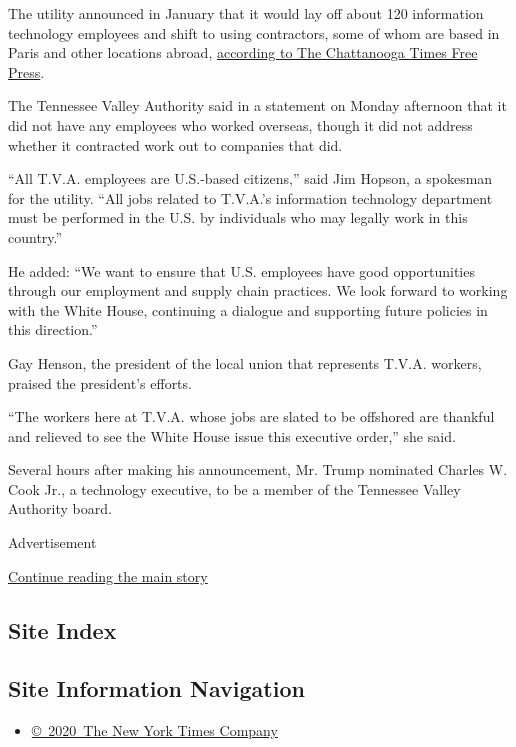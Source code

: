 The utility announced in January that it would lay off about 120
information technology employees and shift to using contractors, some of
whom are based in Paris and other locations abroad,
\href{https://www.timesfreepress.com/news/business/aroundregion/story/2020/jan/28/tvcuts-120-jobs-it-it-outsources-software-wor/514284/}{according
to The Chattanooga Times Free Press}.

The Tennessee Valley Authority said in a statement on Monday afternoon
that it did not have any employees who worked overseas, though it did
not address whether it contracted work out to companies that did.

``All T.V.A. employees are U.S.-based citizens,'' said Jim Hopson, a
spokesman for the utility. ``All jobs related to T.V.A.'s information
technology department must be performed in the U.S. by individuals who
may legally work in this country.''

He added: ``We want to ensure that U.S. employees have good
opportunities through our employment and supply chain practices. We look
forward to working with the White House, continuing a dialogue and
supporting future policies in this direction.''

Gay Henson, the president of the local union that represents T.V.A.
workers, praised the president's efforts.

``The workers here at T.V.A. whose jobs are slated to be offshored are
thankful and relieved to see the White House issue this executive
order,'' she said.

Several hours after making his announcement, Mr. Trump nominated Charles
W. Cook Jr., a technology executive, to be a member of the Tennessee
Valley Authority board.

Advertisement

\protect\hyperlink{after-bottom}{Continue reading the main story}

\hypertarget{site-index}{%
\subsection{Site Index}\label{site-index}}

\hypertarget{site-information-navigation}{%
\subsection{Site Information
Navigation}\label{site-information-navigation}}

\begin{itemize}
\tightlist
\item
  \href{https://help.nytimes3xbfgragh.onion/hc/en-us/articles/115014792127-Copyright-notice}{©~2020~The
  New York Times Company}
\end{itemize}

